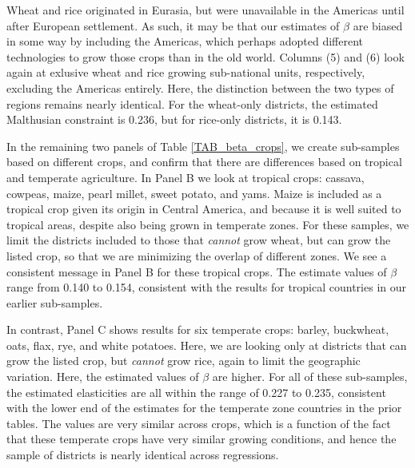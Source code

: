 \documentclass[11pt]{article}
\begin{document}
Wheat and rice originated in Eurasia, but were unavailable in the Americas until after European settlement. As such, it may be that our estimates of $\beta$ are biased in some way by including the Americas, which perhaps adopted different technologies to grow those crops than in the old world. Columns (5) and (6) look again at exlusive wheat and rice growing sub-national units, respectively, excluding the Americas entirely. Here, the distinction between the two types of regions remains nearly identical. For the wheat-only districts, the estimated Malthusian constraint is 0.236, but for rice-only districts, it is 0.143. 

In the remaining two panels of Table \ref{TAB_beta_crops}, we create sub-samples based on different crops, and confirm that there are differences based on tropical and temperate agriculture. In Panel B we look at tropical crops: cassava, cowpeas, maize, pearl millet, sweet potato, and yams. Maize is included as a tropical crop given its origin in Central America, and because it is well suited to tropical areas, despite also being grown in temperate zones. For these samples, we limit the districts included to those that \textit{cannot} grow wheat, but can grow the listed crop, so that we are minimizing the overlap of different zones. We see a consistent message in Panel B for these tropical crops. The estimate values of $\beta$ range from 0.140 to 0.154, consistent with the results for tropical countries in our earlier sub-samples.

In contrast, Panel C shows results for six temperate crops: barley, buckwheat, oats, flax, rye, and white potatoes. Here, we are looking only at districts that can grow the listed crop, but \textit{cannot} grow rice, again to limit the geographic variation. Here, the estimated values of $\beta$ are higher. For all of these sub-samples, the estimated elasticities are all within the range of 0.227 to 0.235, consistent with the lower end of the estimates for the temperate zone countries in the prior tables. The values are very similar across crops, which is a function of the fact that these temperate crops have very similar growing conditions, and hence the sample of districts is nearly identical across regressions. 
\end{document}
